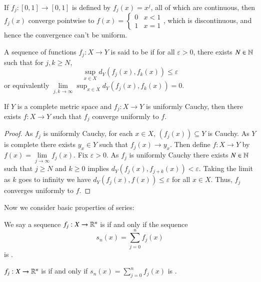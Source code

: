 \begin{eg}
    If $f_j:[0,1]\rightarrow [0,1]$ is defined by $f_j(x) = x^j$, all of which are continuous, then $f_j(x)$ converge pointwise to $f(x) = \left\{\begin{array}{cc} 0 & x < 1 \\ 1 & x = 1\end{array}\right.$, which is discontinuous, and hence the convergence can't be uniform.
\end{eg}

\begin{defn}
    A sequence of functions $f_j:X\rightarrow Y$ is said to be  if for all $\varepsilon > 0$, there exists $N \in \mathbb N$ such that for $j,k\geq N$, $$\sup_{x\in X}d_Y(f_j(x),f_k(x)) \leq \varepsilon$$ or equivalently $\lim\limits_{j,k\rightarrow \infty}\sup_{x\in X}d_Y(f_j(x),f_k(x))  = 0$.
\end{defn}

\begin{prop}\label{prop:3.2.2}
    If $Y$ is a complete metric space and $f_j:X\rightarrow Y$ is uniformly Cauchy, then there exists $f:X\rightarrow Y$ such that $f_j$ converge uniformly to $f$.
\end{prop}
\begin{proof}
    As $f_j$ is uniformly Cauchy, for each $x \in X$, $(f_j(x)) \subseteq Y$ is Cauchy. As $Y$ is complete there exists $y_x \in Y$ such that $f_j(x)\rightarrow y_x$. Then define $f:X\rightarrow Y$ by $f(x) = \lim\limits_{j\rightarrow \infty}f_j(x)$. Fix $\varepsilon > 0$. As $f_j$ is uniformly Cauchy there exists $N \in \mathbb N$ such that $j \geq N$ and $k \geq 0$ implies $d_Y(f_j(x),f_{j+k}(x)) < \varepsilon$. Taking the limit as $k$ goes to infinity we have $d_Y(f_j(x),f(x)) \leq \varepsilon$ for all $x \in X$. Thus, $f_j$ converges uniformly to $f$.
\end{proof}


Now we consider basic properties of series: 

\begin{defn}
    We say a sequence $f_j:X\rightarrow \mathbb R^n$ is  if and only if the sequence \begin{equation*}
        s_n(x) = \sum_{j=0}^{n}f_j(x)
    \end{equation*}
    is .
\end{defn}

\begin{defn}
    $f_j:X\rightarrow \mathbb R^n$ is  if and only if $s_n(x) = \sum_{j=0}^nf_j(x)$ is .
\end{defn}

